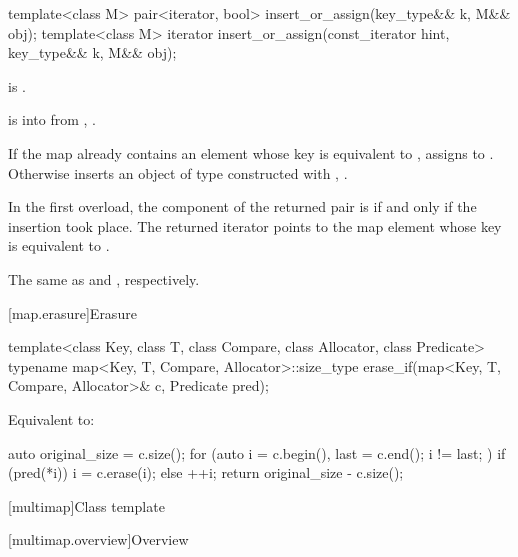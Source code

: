 %
\begin{itemdecl}
template<class M>
  pair<iterator, bool> insert_or_assign(key_type&& k, M&& obj);
template<class M>
  iterator insert_or_assign(const_iterator hint, key_type&& k, M&& obj);
\end{itemdecl}

\begin{itemdescr}
\pnum
\mandates
{} is .

\pnum
\expects
{} is  into 
from , .

\pnum
\effects
If the map already contains an element 
whose key is equivalent to ,
assigns  to .
Otherwise inserts an object of type 
constructed with , .

\pnum
\returns
In the first overload,
the  component of the returned pair is 
if and only if the insertion took place.
The returned iterator points to the map element
whose key is equivalent to .

\pnum
\complexity
The same as  and ,
respectively.
\end{itemdescr}

[map.erasure]{Erasure}

%
\begin{itemdecl}
template<class Key, class T, class Compare, class Allocator, class Predicate>
  typename map<Key, T, Compare, Allocator>::size_type
    erase_if(map<Key, T, Compare, Allocator>& c, Predicate pred);
\end{itemdecl}

\begin{itemdescr}
\pnum
\effects
Equivalent to:
\begin{codeblock}
auto original_size = c.size();
for (auto i = c.begin(), last = c.end(); i != last; ) {
  if (pred(*i)) {
    i = c.erase(i);
  } else {
    ++i;
  }
}
return original_size - c.size();
\end{codeblock}
\end{itemdescr}

[multimap]{Class template }

[multimap.overview]{Overview}

